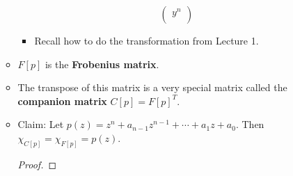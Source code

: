 \documentclass[../notes.tex]{subfiles}
\begin{document}
\begin{itemize}
\begin{itemize}
\begin{equation*}
\begin{pmatrix}
                y^n\\
            \end{pmatrix}
        \end{equation*}
        \begin{itemize}
            \item Recall how to do the transformation from Lecture 1.
        \end{itemize}
        \item $F[p]$ is the \textbf{Frobenius matrix}.
        \item The transpose of this matrix is a very special matrix called the \textbf{companion matrix} $C[p]=F[p]^T$.
        \item Claim: Let $p(z)=z^n+a_{n-1}z^{n-1}+\cdots+a_1z+a_0$. Then $\chi_{C[p]}=\chi_{F[p]}=p(z)$.
        \begin{proof}



\end{proof}
\end{itemize}
\end{itemize}
\end{document}
